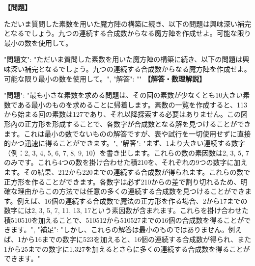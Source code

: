 \documentclass[10pt,a4paper,oneside,openany]{ltjsbook}
\begin{document}
\begin{tcolorbox}[colback=softblue,colframe=primaryblue,title=\textbf{第 411 問：A MAGIC SQUARE OF COMPOSITES.},arc=2mm,boxrule=1pt,breakable]
\textbf{【問題】}\par\vspace{0.3em}
ただいま質問した素数を用いた魔方陣の構築に続き、以下の問題は興味深い補完となるでしょう。九つの連続する合成数からなる魔方陣を作成せよ。可能な限り最小の数を使用して。

{
"問題文": "ただいま質問した素数を用いた魔方陣の構築に続き、以下の問題は興味深い補完となるでしょう。九つの連続する合成数からなる魔方陣を作成せよ。可能な限り最小の数を使用して。",
"解答": ""
}
\tcblower
\textbf{【解答・数理解説】}\par\vspace{0.3em}
{
    "問題": "最も小さな素数を求める問題は、その回の素数が少なくとも10大きい素数である最小のものを求めることに帰着します。素数の一覧を作成すると、113から始まる回の素数は127であり、それ以降探索する必要はありません。この図形內の正方形を形成することで、各数字が合成数となる解を見つけることができます。これは最小の数でないものの解答ですが、表や試行を一切使用せずに直接的かつ迅速に得ることができます。",
    "解答": "まず、1より大きい連続する数字（例：2, 3, 4, 5, 6, 7, 8, 9, 10）を書き出します。これらの数の素因数は2, 3, 5, 7のみです。これら4つの数を掛け合わせた積210を、それぞれの9つの数字に加えます。その結果、212から220までの連続する合成数が得られます。これらの数で正方形を作ることができます。各数字は必ず210からの差で割り切れるため、明確な理由からこの方法では任意の多くの連続する合成数を見つけることができます。例えば、16個の連続する合成数で魔法の正方形を作る場合、2から17までの数字には2, 3, 5, 7, 11, 13, 17という素因数が含まれます。これらを掛け合わせた積510510を加えることで、510512から510527までの16個の合成数を得ることができます。",
    "補足": "しかし、これらの解答は最小のものではありません。例えば、1から16までの数字に523を加えると、16個の連続する合成数が得られ、また1から25までの数字に1,327を加えるとさらに多くの連続する合成数を得ることができます。"
}
\end{tcolorbox}
\end{document}
